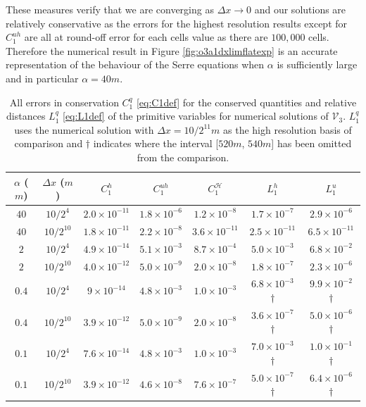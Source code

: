 \documentclass[times]{elsarticle}
\begin{document}
These measures verify that we are converging as $\Delta x \rightarrow 0$ and our solutions are relatively conservative as the errors for the highest resolution results except for $C^{uh}_1$ are all at round-off error for each cells value as there are $100,000$ cells. Therefore the numerical result in Figure \ref{fig:o3a1dxlimflatexp} is an accurate representation of the behaviour of the Serre equations when $\alpha$ is sufficiently large and in particular $\alpha = 40m$. 
\begin{table}
	\centering
	{\renewcommand{\arraystretch}{1.2}
		\begin{tabular}{c c  c  c  c c  c }
			$\alpha$ ($m$)&$\Delta x$ ($m$)& $C^h_1$  & $C^{uh}_1$ & $C^\mathcal{H}_1$ & $L^h_1$  & $L^{u}_1$  \\
			\hline \hline
			$40$ &	${10}/{2^{4}}$ & $2.0\times 10^{-11}$ &  $1.8 \times 10^{-6}$ & $1.2 \times 10^{-8}$ &  $1.7 \times 10^{-7}$ & $2.9 \times 10^{-6}$ \\
			$40$ &	${10}/{2^{10}}$ & $1.8\times 10^{-11}$ &  $2.2 \times 10^{-8}$ & $3.6 \times 10^{-11}$ &  $2.5\times 10^{-11}$ & $6.5\times 10^{-11}$ \\
			\hline
			$2$ &	${10}/{2^{4}}$ & $4.9\times 10^{-14}$ &  $5.1\times 10^{-3}$ & $8.7 \times 10^{-4}$  & $5.0\times 10^{-3}$ & $6.8\times 10^{-2}$ \\
			$2$ &	${10}/{2^{10}}$ & $4.0\times 10^{-12}$ &  $5.0 \times 10^{-9}$ & $2.0 \times 10^{-8}$ &  $1.8\times 10^{-7}$ & $2.3\times 10^{-6}$  \\
			\hline
			$0.4$ &	${10}/{2^{4}}$ & $9\times 10^{-14}$ &  $4.8\times 10^{-3}$ & $1.0 \times 10^{-3}$ & $6.8\times 10^{-3}$ $\dagger$ & $9.9\times 10^{-2}$ $\dagger$\\
			$0.4$ &	${10}/{2^{10}}$ & $3.9\times 10^{-12}$ &  $5.0 \times 10^{-9}$ & $2.0 \times 10^{-8}$  &   $3.6\times 10^{-7}$ $\dagger$ &  $5.0\times 10^{-6}$ $\dagger$\\
			\hline
			$0.1$ &	${10}/{2^{4}}$ & $7.6\times 10^{-14}$ &  $4.8\times 10^{-3}$ & $1.0 \times 10^{-3}$ &  $7.0\times 10^{-3}$ $\dagger$ &   $1.0\times 10^{-1}$ $\dagger$ \\
			$0.1$ &	${10}/{2^{10}}$ & $3.9\times 10^{-12}$ &  $4.6 \times 10^{-8}$ & $7.6 \times 10^{-7}$  & $5.0\times 10^{-7}$ $\dagger$ & $6.4\times 10^{-6}$ $\dagger$  \\
			\hline \hline
		\end{tabular}
		}
		\caption{All errors in conservation $C^{q}_1$ \eqref{eq:C1def} for the conserved quantities and relative distances $L^{q}_1$ \eqref{eq:L1def} of the primitive variables for numerical solutions of $\mathcal{V}_3$. $L^{q}_1$ uses the numerical solution with $\Delta x = 10/2^{11}m$ as the high resolution basis of comparison and $\dagger$ indicates where the interval [$520m$, $540m$] has been omitted from the comparison.}
		\label{tab:L1C1}
\end{table}
\end{document}

